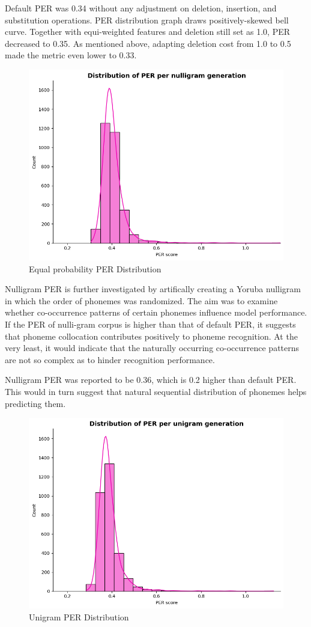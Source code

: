 \documentclass[11pt]{article}
\begin{document}
{Default PER was 0.34 without any adjustment on deletion, insertion, and substitution operations. PER distribution graph draws positively-skewed bell curve. Together with equi-weighted features and deletion still set as 1.0, PER decreased to 0.35. As mentioned above, adapting deletion cost from 1.0 to 0.5 made the metric even lower to 0.33.

\begin{figure}
    \centering
    \includegraphics[width=0.75\linewidth]{nulligram_PER_distribution.png}
    \caption{Equal probability PER Distribution}
    \label{fig:placeholder}
\end{figure}
Nulligram PER is further investigated by artifically creating a Yoruba nulligram in which the order of phonemes was randomized. The aim was to examine whether co-occurrence patterns of certain phonemes influence model performance. If the PER of nulli-gram corpus is higher than that of default PER, it suggests that phoneme collocation contributes positively to phoneme recognition. At the very least, it would indicate that the naturally occurring co-occurrence patterns are not so complex as to hinder recognition performance.

Nulligram PER was reported to be 0.36, which is 0.2 higher than default PER. This would in turn suggest that natural sequential distribution of phonemes helps predicting them.
\begin{figure}
    \centering
    \includegraphics[width=0.75\linewidth]{unigram_PER_distribution.png}
    \caption{Unigram PER Distribution}
    \label{fig:placeholder}
\end{figure}

}
\end{document}
